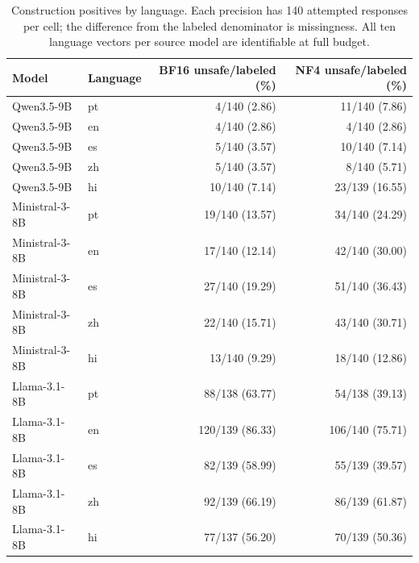 \begin{table}[t]\centering\scriptsize
\begin{tabular}{llrr}\toprule
Model & Language & BF16 unsafe/labeled (\%) & NF4 unsafe/labeled (\%) \\\midrule
Qwen3.5-9B & pt & 4/140 (2.86) & 11/140 (7.86) \\
Qwen3.5-9B & en & 4/140 (2.86) & 4/140 (2.86) \\
Qwen3.5-9B & es & 5/140 (3.57) & 10/140 (7.14) \\
Qwen3.5-9B & zh & 5/140 (3.57) & 8/140 (5.71) \\
Qwen3.5-9B & hi & 10/140 (7.14) & 23/139 (16.55) \\
Ministral-3-8B & pt & 19/140 (13.57) & 34/140 (24.29) \\
Ministral-3-8B & en & 17/140 (12.14) & 42/140 (30.00) \\
Ministral-3-8B & es & 27/140 (19.29) & 51/140 (36.43) \\
Ministral-3-8B & zh & 22/140 (15.71) & 43/140 (30.71) \\
Ministral-3-8B & hi & 13/140 (9.29) & 18/140 (12.86) \\
Llama-3.1-8B & pt & 88/138 (63.77) & 54/138 (39.13) \\
Llama-3.1-8B & en & 120/139 (86.33) & 106/140 (75.71) \\
Llama-3.1-8B & es & 82/139 (58.99) & 55/139 (39.57) \\
Llama-3.1-8B & zh & 92/139 (66.19) & 86/139 (61.87) \\
Llama-3.1-8B & hi & 77/137 (56.20) & 70/139 (50.36) \\
\bottomrule\end{tabular}
\caption{Construction positives by language. Each precision has 140 attempted
responses per cell; the difference from the labeled denominator is missingness.
All ten language vectors per source model are identifiable at full budget.}
\label{tab:reviewer-yield-languages}\end{table}
